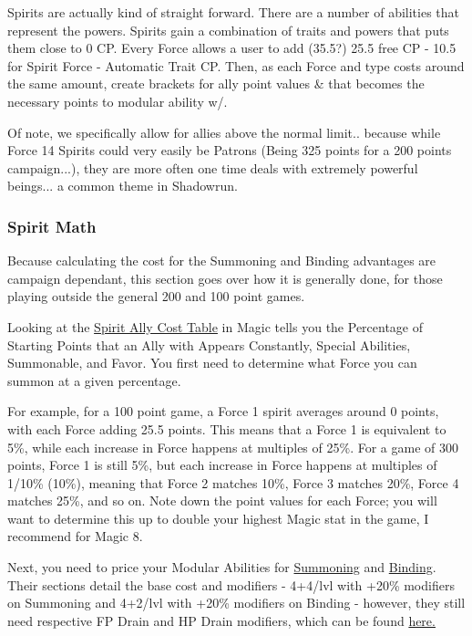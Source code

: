 \begin{multicols*}{2}
	Spirits are actually kind of straight forward. There are a number of abilities that represent the powers. Spirits gain a combination of traits and powers that puts them close to 0 CP. Every Force allows a user to add (35.5?) 25.5 free CP - 10.5 for Spirit Force - Automatic Trait CP.  Then, as each Force and type costs around the same amount, create brackets for ally point values \& that becomes the necessary points to modular ability w/.
	
	Of note, we specifically allow for allies above the normal limit.. because while Force 14 Spirits could very easily be Patrons (Being 325 points for a 200 points campaign...), they are more often one time deals with extremely powerful beings... a common theme in Shadowrun.
	
	\subsubsection{Spirit Math}\label{spirit_math}
	
	Because calculating the cost for the Summoning and Binding advantages are campaign dependant, this section goes over how it is generally done, for those playing outside the general 200 and 100 point games.
	
	Looking at the \hyperref[spirit_ally_cost]{Spirit Ally Cost Table} in Magic tells you the Percentage of Starting Points that an Ally with Appears Constantly, Special Abilities, Summonable, and Favor. You first need to determine what Force you can summon at a given percentage.
	
	For example, for a 100 point game, a Force 1 spirit averages around 0 points, with each Force adding 25.5 points. This means that a Force 1 is equivalent to 5\%, while each increase in Force happens at multiples of 25\%. For a game of 300 points, Force 1 is still 5\%, but each increase in Force happens at multiples of 1/10\% (10\%), meaning that Force 2 matches 10\%, Force 3 matches 20\%, Force 4 matches 25\%, and so on. Note down the point values for each Force; you will want to determine this up to double your highest Magic stat in the game, I recommend for Magic 8.
	
	Next, you need to price your Modular Abilities for \hyperref[summoning]{Summoning} and \hyperref[binding]{Binding}. Their sections detail the base cost and modifiers - 4+4/lvl with +20\% modifiers on Summoning and 4+2/lvl with +20\% modifiers on Binding - however, they still need respective FP Drain and HP Drain modifiers, which can be found \hyperref[drain_mods]{here.}
	

\end{multicols*}
